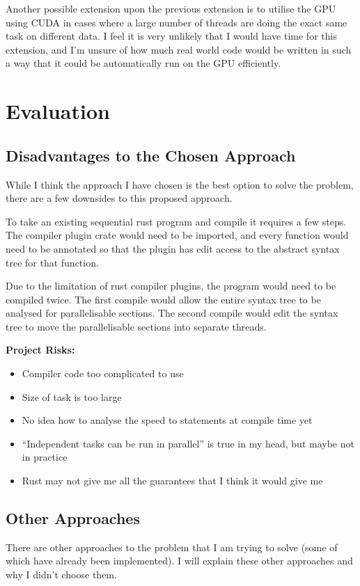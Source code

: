 \documentclass[12pt, a4paper]{article}
\begin{document}
Another possible extension upon the previous extension is to utilise the GPU using CUDA in cases where a large number of threads are doing the exact same task on different data. I feel it is very unlikely that I would have time for this extension, and I'm unsure of how much real world code would be written in such a way that it could be automatically run on the GPU efficiently.

\section{Evaluation}
\subsection{Disadvantages to the Chosen Approach}
While I think the approach I have chosen is the best option to solve the problem, there are a few downsides to this proposed approach.

To take an existing sequential rust program and compile it requires a few steps. The compiler plugin crate would need to be imported, and every function would need to be annotated so that the plugin has edit access to the abstract syntax tree for that function.

Due to the limitation of rust compiler plugins, the program would need to be compiled twice. The first compile would allow the entire syntax tree to be analysed for parallelisable sections. The second compile would edit the syntax tree to move the parallelisable sections into separate threads.

\textbf{Project Risks:}
\begin{itemize}
	\item Compiler code too complicated to use
	\item Size of task is too large
	\item No idea how to analyse the speed to statements at compile time yet
	\item ``Independent tasks can be run in parallel'' is true in my head, but maybe not in practice
	\item Rust may not give me all the guarantees that I think it would give me
\end{itemize}


\subsection{Other Approaches}
There are other approaches to the problem that I am trying to solve (some of which have already been implemented). I will explain these other approaches and why I didn't choose them.
\end{document}

